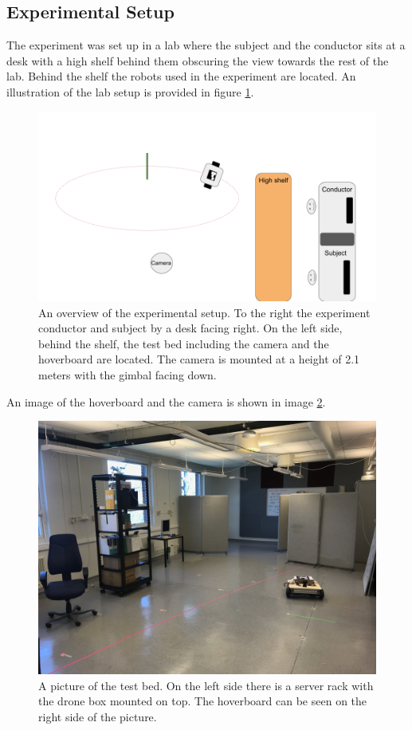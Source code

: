 \documentclass[nofilelist]{cslthse-msc}
\begin{document}
\subsection{Experimental Setup}
The experiment was set up in a lab where the subject and the conductor sits at a desk with a high shelf behind them obscuring the view towards the rest of the lab. Behind the shelf the robots used in the experiment are located. An illustration of the lab setup is provided in figure \ref{fig:exp-setup}. 

\begin{figure}[!hbt]
   \centering
   \includegraphics[scale=0.3]{images/exp-setup.png} 
   \caption{An overview of the experimental setup. To the right the experiment conductor and subject by a desk facing right. On the left side, behind the shelf, the test bed including the camera and the hoverboard are located. The camera is mounted at a height of 2.1 meters with the gimbal facing down.}
   \label{fig:exp-setup}
\end{figure}

An image of the hoverboard and the camera is shown in image \ref{fig:real-exp}.

\begin{figure}[!hbt]
   \centering
   \includegraphics[scale=0.1]{images/testbed.jpg} 
   \caption{A picture of the test bed. On the left side there is a server rack with the drone box mounted on top. The hoverboard can be seen on the right side of the picture.}
   \label{fig:real-exp}
\end{figure}
\end{document}
